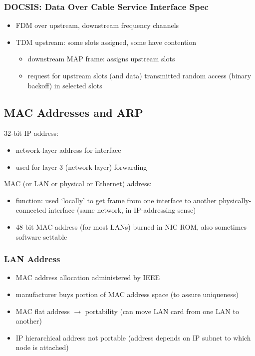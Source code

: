 \subsubsection{DOCSIS: Data Over Cable Service Interface Spec}\label{sec:docsis}
\begin{itemize}
	\item FDM over upstream, downstream frequency channels
	\item TDM upstream: some slots assigned, some have contention
	\begin{itemize}
		\item downstream MAP frame: assigns upstream slots
		\item request for upstream slots (and data) transmitted random access (binary backoff) in selected slots
	\end{itemize}
\end{itemize}

\subsection{MAC Addresses and ARP}
32-bit IP address:
\begin{itemize}
	\item network-layer address for interface
	\item used for layer 3 (network layer) forwarding
\end{itemize}
MAC (or LAN or physical or Ethernet) address:
\begin{itemize}
	\item function: used `locally' to get frame from one interface to another physically-connected interface (same network, in IP-addressing sense)
	\item 48 bit MAC address (for most LANs) burned in NIC ROM, also sometimes software settable
\end{itemize}
\subsubsection{LAN Address}
\begin{itemize}
	\item MAC address allocation administered by IEEE
	\item manufacturer buys portion of MAC address space (to assure uniqueness)
	\item MAC flat address $\rightarrow$ portability (can move LAN card from one LAN to another)
	\item IP hierarchical address not portable (address depends on IP subnet to which node is attached)
\end{itemize}
